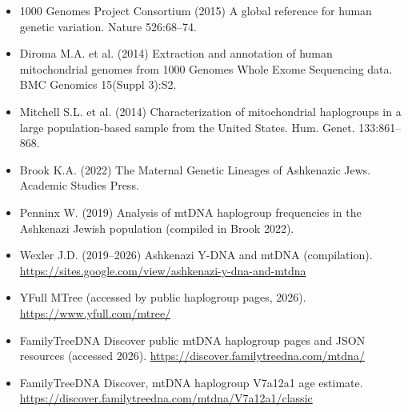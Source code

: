 \documentclass[11pt]{article}
\begin{document}
\begin{itemize}
\item 1000 Genomes Project Consortium (2015) A global reference for human genetic variation. Nature 526:68--74.
\item Diroma M.A. et al. (2014) Extraction and annotation of human mitochondrial genomes from 1000 Genomes Whole Exome Sequencing data. BMC Genomics 15(Suppl 3):S2.
\item Mitchell S.L. et al. (2014) Characterization of mitochondrial haplogroups in a large population-based sample from the United States. Hum. Genet. 133:861--868.
\item Brook K.A. (2022) The Maternal Genetic Lineages of Ashkenazic Jews. Academic Studies Press.
\item Penninx W. (2019) Analysis of mtDNA haplogroup frequencies in the Ashkenazi Jewish population (compiled in Brook 2022).
\item Wexler J.D. (2019--2026) Ashkenazi Y-DNA and mtDNA (compilation). \url{https://sites.google.com/view/ashkenazi-y-dna-and-mtdna}
\item YFull MTree (accessed by public haplogroup pages, 2026). \url{https://www.yfull.com/mtree/}
\item FamilyTreeDNA Discover public mtDNA haplogroup pages and JSON resources (accessed 2026). \url{https://discover.familytreedna.com/mtdna/}
\item FamilyTreeDNA Discover, mtDNA haplogroup V7a12a1 age estimate. \url{https://discover.familytreedna.com/mtdna/V7a12a1/classic}
\end{itemize}
\end{document}

